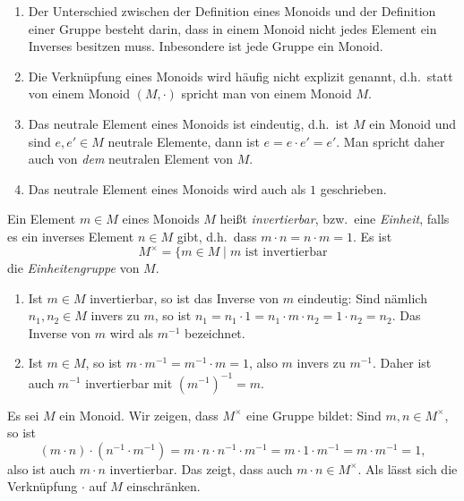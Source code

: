 \begin{bem}
 \begin{enumerate}
  \item
   Der Unterschied zwischen der Definition eines Monoids und der Definition einer Gruppe besteht darin, dass in einem Monoid nicht jedes Element ein Inverses besitzen muss. Inbesondere ist jede Gruppe ein Monoid.
  \item
   Die Verknüpfung eines Monoids wird häufig nicht explizit genannt, d.h.\ statt von einem Monoid $(M,\cdot)$ spricht man von einem Monoid $M$.
  \item
   Das neutrale Element eines Monoids ist eindeutig, d.h.\ ist $M$ ein Monoid und sind $e, e' \in M$ neutrale Elemente, dann ist $e = e \cdot e' = e'$. Man spricht daher auch von \emph{dem} neutralen Element von $M$.
  \item
   Das neutrale Element eines Monoids wird auch als $1$ geschrieben.
 \end{enumerate}
\end{bem}

\begin{defi}
 Ein Element $m \in M$ eines Monoids $M$ heißt \emph{invertierbar}, bzw.\ eine \emph{Einheit}, falls es ein inverses Element $n \in M$ gibt, d.h.\ dass $m \cdot n = n \cdot m = 1$. Es ist
 \[
  M^\times = \{m \in M \mid \text{$m$ ist invertierbar}
 \]
 die \emph{Einheitengruppe} von $M$.
\end{defi}

\begin{bem}
 \begin{enumerate}[leftmargin=*]
  \item
   Ist $m \in M$ invertierbar, so ist das Inverse von $m$ eindeutig: Sind nämlich $n_1, n_2 \in M$ invers zu $m$, so ist $n_1 = n_1 \cdot 1 = n_1 \cdot m \cdot n_2 = 1 \cdot n_2 = n_2$. Das Inverse von $m$ wird als $m^{-1}$ bezeichnet.
  \item
   Ist $m \in M$, so ist $m \cdot m^{-1} = m^{-1} \cdot m = 1$, also $m$ invers zu $m^{-1}$. Daher ist auch $m^{-1}$ invertierbar mit $(m^{-1})^{-1} = m$.
 \end{enumerate}
\end{bem}

Es sei $M$ ein Monoid. Wir zeigen, dass $M^\times$ eine Gruppe bildet: Sind $m, n \in M^\times$, so ist
\[
 (m \cdot n) \cdot (n^{-1} \cdot m^{-1})
 = m \cdot n \cdot n^{-1} \cdot m^{-1}
 = m \cdot 1 \cdot m^{-1}
 = m \cdot m^{-1}
 = 1,
\]
also ist auch $m \cdot n$ invertierbar. Das zeigt, dass auch $m \cdot n \in M^\times$. Als lässt sich die Verknüpfung $\cdot$ auf $M$ einschränken.

